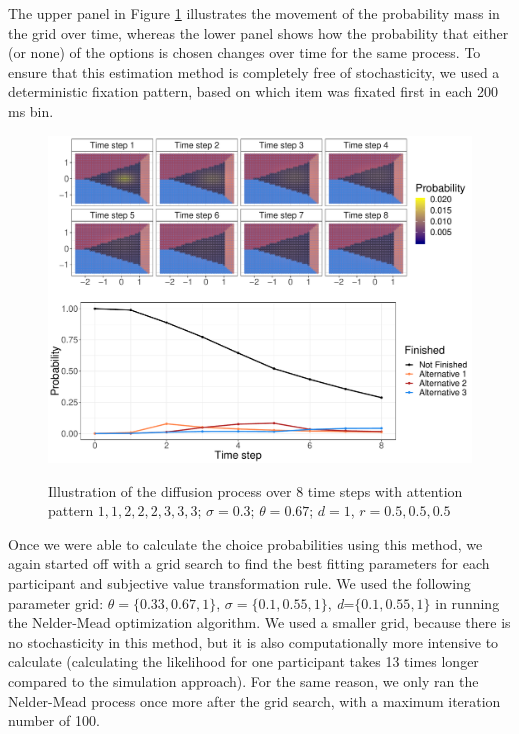 \documentclass[11pt,a4paper]{article}
\begin{document}
The upper panel in Figure \ref{fig:process} illustrates the movement of the probability mass in the grid over time, whereas the lower panel shows how the probability that either (or none) of the options is chosen changes over time for the same process. To ensure that this estimation method is completely free of stochasticity, we used a deterministic fixation pattern, based on which item was fixated first in each 200 ms bin. 



\begin{landscape}
\pagestyle{empty}%
\begin{figure}
\captionsetup{justification=centering}
\caption{Illustration of the diffusion process over 8 time steps with attention pattern $1, 1, 2, 2, 2, 3, 3, 3$; $\sigma = 0.3$; $\theta = 0.67$; $d = 1$, $r = 0.5, 0.5, 0.5$}
\centering
\includegraphics[width=1\textwidth]{process.pdf}
\label{fig:process}
\end{figure}
\end{landscape}
\restoregeometry


Once we were able to calculate the choice probabilities using this method, we again started off with a grid search to find the best fitting parameters for each participant and subjective value transformation rule. We used the following parameter grid: $\theta=\{0.33, 0.67, 1\}$, $\sigma=\{0.1, 0.55, 1\}$, \textit{d}=$\{0.1, 0.55, 1\}$ in running the Nelder-Mead optimization algorithm. We used a smaller grid, because there is no stochasticity in this method, but it is also computationally more intensive to calculate (calculating the likelihood for one participant takes 13 times longer compared to the simulation approach). For the same reason, we only ran the Nelder-Mead process once more after the grid search, with a maximum iteration number of 100.  
\end{document}
